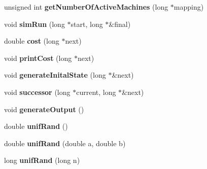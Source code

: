 \begin{DoxyCompactItemize}
\item 
\hypertarget{classGuaranteedEmbedding_acff6a21c6107fd35f698ef9c3f7f01bd}{unsigned int {\bfseries get\-Number\-Of\-Active\-Machines} (long $\ast$mapping)}\label{classGuaranteedEmbedding_acff6a21c6107fd35f698ef9c3f7f01bd}

\item 
\hypertarget{classGuaranteedEmbedding_aa69d1a19b4365f04df6f0e7a6e6eb2fe}{void {\bfseries sim\-Run} (long $\ast$start, long $\ast$\&final)}\label{classGuaranteedEmbedding_aa69d1a19b4365f04df6f0e7a6e6eb2fe}

\item 
\hypertarget{classGuaranteedEmbedding_a1a9acaca2239f3dbd6f7ab5b9ed996ff}{double {\bfseries cost} (long $\ast$next)}\label{classGuaranteedEmbedding_a1a9acaca2239f3dbd6f7ab5b9ed996ff}

\item 
\hypertarget{classGuaranteedEmbedding_a8234d61588bf196e66f5d6fb04f6779c}{void {\bfseries print\-Cost} (long $\ast$next)}\label{classGuaranteedEmbedding_a8234d61588bf196e66f5d6fb04f6779c}

\item 
\hypertarget{classGuaranteedEmbedding_af5940a5ec0c3eb0c4ab65ae1c6e56326}{void {\bfseries generate\-Inital\-State} (long $\ast$\&next)}\label{classGuaranteedEmbedding_af5940a5ec0c3eb0c4ab65ae1c6e56326}

\item 
\hypertarget{classGuaranteedEmbedding_ad97afe2ae02a0c105a7a94e4046c2f10}{void {\bfseries successor} (long $\ast$current, long $\ast$\&next)}\label{classGuaranteedEmbedding_ad97afe2ae02a0c105a7a94e4046c2f10}

\item 
\hypertarget{classGuaranteedEmbedding_a85a7fb5ade9f22ddfde2d869233563e9}{void {\bfseries generate\-Output} ()}\label{classGuaranteedEmbedding_a85a7fb5ade9f22ddfde2d869233563e9}

\item 
\hypertarget{classGuaranteedEmbedding_af4135c69be298834de353c79de948eae}{double {\bfseries unif\-Rand} ()}\label{classGuaranteedEmbedding_af4135c69be298834de353c79de948eae}

\item 
\hypertarget{classGuaranteedEmbedding_a7017d75dd599e710e564c4721089fa60}{double {\bfseries unif\-Rand} (double a, double b)}\label{classGuaranteedEmbedding_a7017d75dd599e710e564c4721089fa60}

\item 
\hypertarget{classGuaranteedEmbedding_a2514167960cb56e900eff9e91b6ea3c8}{long {\bfseries unif\-Rand} (long n)}\label{classGuaranteedEmbedding_a2514167960cb56e900eff9e91b6ea3c8}


\end{DoxyCompactItemize}
